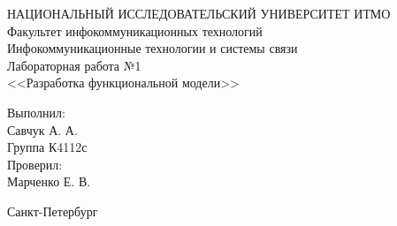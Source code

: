 \begin{titlepage}

  \begin{center}
    НАЦИОНАЛЬНЫЙ ИССЛЕДОВАТЕЛЬСКИЙ УНИВЕРСИТЕТ ИТМО\\[0.1cm]
    Факультет инфокоммуникационных технологий\\
    Инфокоммуникационные технологии и системы связи\\[5cm]

    {\Large Лабораторная работа №1}\\[0.1cm]
    \noindent<<Разработка функциональной модели>>\\[3cm]
  \end{center}

  \begin{minipage}{0.65\linewidth}
    \hspace{\fill}
  \end{minipage}
  \begin{minipage}{0.25\linewidth}
    Выполнил:\\
    Савчук А. А.\\
    Группа К4112с \\

    Проверил:\\
    Марченко Е. В.
  \end{minipage}

  \vfill

  \begin{center}
    Санкт-Петербург\\
    \the\year
  \end{center}

\end{titlepage}
